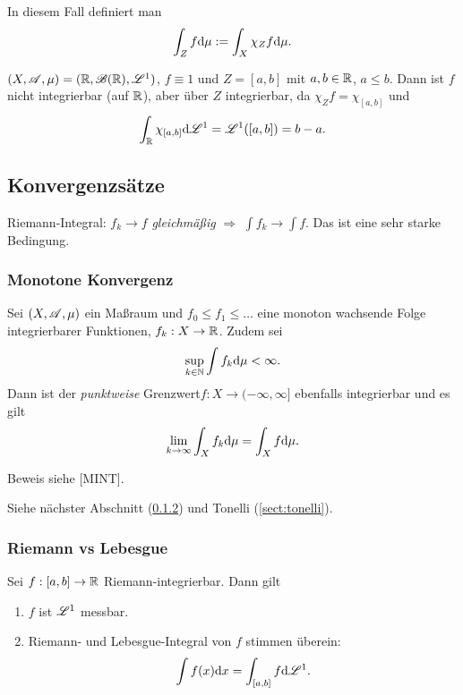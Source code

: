  In diesem Fall definiert man
 \[ \int_Z f \mathrm{d} \mu := \int_X \chi_Z f \mathrm{d} \mu. \]

\begin{exmp}
 $(X,\mathscr{A},\mu) = (\mathbb{R}, \mathscr{B}(\mathbb{R}), \mathscr{L}^1 )$, $f \equiv 1$ und $Z = [a,b]$ mit $a,b \in \mathbb{R}$, $a \le b$. Dann ist $f$ nicht integrierbar (auf $\mathbb{R}$), aber über $Z$ integrierbar, da $\chi_Z f = \chi_{[a,b]}$ und
 \[ \int_{\mathbb{R}} \chi_{[a,b]} \mathrm{d} \mathscr{L}^1 = \mathscr{L}^1( [a,b] ) = b - a. \]
\end{exmp}

\subsection{Konvergenzsätze}
 Riemann-Integral: $f_k \to f$ \emph{gleichmäßig} $\Rightarrow$ $\int f_k \to \int f$. Das ist eine sehr starke Bedingung.
 
\subsubsection{Monotone Konvergenz}
\begin{thm}
 Sei $(X,\mathscr{A},\mu)$ ein Maßraum und $f_0 \le f_1 \le \ldots$ eine monoton wachsende Folge integrierbarer Funktionen, $f_k : X \to \mathbb{R}$. Zudem sei
 \[ \sup_{k \in \mathbb{N}} \int f_k \mathrm{d} \mu < \infty. \]
 Dann ist der \emph{punktweise} Grenzwert\footnotemark $f: X \to (-\infty, \infty]$ ebenfalls integrierbar und es gilt
 \[ \lim_{k \to \infty} \int_X f_k \mathrm{d} \mu = \int_X f \mathrm{d} \mu. \]
\end{thm}

Beweis siehe [MINT].

\begin{exmp}
 Siehe nächster Abschnitt (\ref{sect:riemann-lebesgue}) und Tonelli (\ref{sect:tonelli}).
\end{exmp}

\subsubsection{Riemann vs Lebesgue}\label{sect:riemann-lebesgue}
\begin{kor}
 Sei $f:[a,b] \to \mathbb{R}$ Riemann-integrierbar. Dann gilt
 \begin{enumerate}
  \item $f$ ist $\mathscr{L}^1$ messbar.
  \item Riemann- und Lebesgue-Integral von $f$ stimmen überein:
   \[ \int f(x) \mathrm{d} x = \int_{[a,b]} f \mathrm{d} \mathscr{L}^1. \]
 \end{enumerate}
\end{kor}

